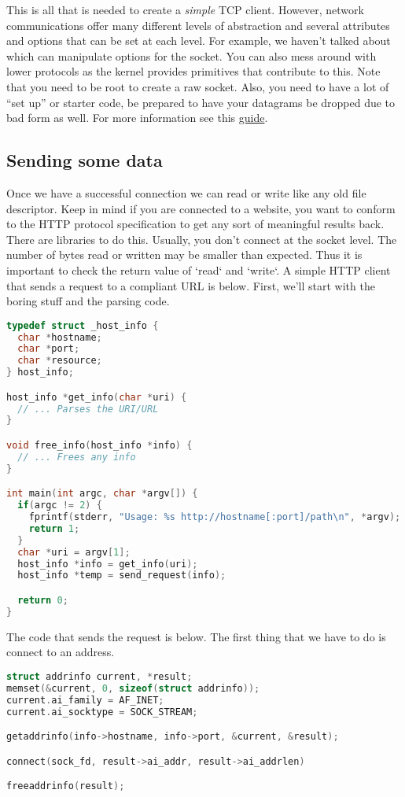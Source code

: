 This is all that is needed to create a \textit{simple} TCP client.
However, network communications offer many different levels of abstraction and several attributes and options that can be set at each level.
For example, we haven't talked about  which can manipulate options for the socket.
You can also mess around with lower protocols as the kernel provides primitives that contribute to this.
Note that you need to be root to create a raw socket.
Also, you need to have a lot of ``set up'' or starter code, be prepared to have your datagrams be dropped due to bad form as well.
For more information see this \href{http://www.beej.us/guide/bgnet/output/html/multipage/getaddrinfoman.html}{guide}.

\subsection{Sending some data}

Once we have a successful connection we can read or write like any old file descriptor.
Keep in mind if you are connected to a website, you want to conform to the HTTP protocol specification to get any sort of meaningful results back.
There are libraries to do this.
Usually, you don't connect at the socket level.
The number of bytes read or written may be smaller than expected.
Thus it is important to check the return value of `read` and `write`.
A simple HTTP client that sends a request to a compliant URL is below.
First, we'll start with the boring stuff and the parsing code.

\begin{lstlisting}[language=C]
typedef struct _host_info {
  char *hostname;
  char *port;
  char *resource;
} host_info;

host_info *get_info(char *uri) {
  // ... Parses the URI/URL
}

void free_info(host_info *info) {
  // ... Frees any info
}

int main(int argc, char *argv[]) {
  if(argc != 2) {
    fprintf(stderr, "Usage: %s http://hostname[:port]/path\n", *argv);
    return 1;
  }
  char *uri = argv[1];
  host_info *info = get_info(uri);
  host_info *temp = send_request(info);

  return 0;
}
\end{lstlisting}

The code that sends the request is below.
The first thing that we have to do is connect to an address.

\begin{lstlisting}[language=C]
struct addrinfo current, *result;
memset(&current, 0, sizeof(struct addrinfo));
current.ai_family = AF_INET;
current.ai_socktype = SOCK_STREAM;

getaddrinfo(info->hostname, info->port, &current, &result);

connect(sock_fd, result->ai_addr, result->ai_addrlen)

freeaddrinfo(result);
\end{lstlisting}

